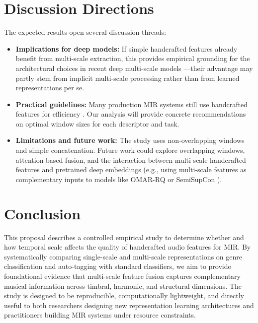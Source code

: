 \documentclass[conference]{IEEEtran}
\begin{document}
\section{Discussion Directions}

The expected results open several discussion threads:

\begin{itemize}
    \item \textbf{Implications for deep models:} If simple handcrafted features already benefit from multi-scale extraction, this provides empirical grounding for the architectural choices in recent deep multi-scale models \cite{buisson2024self, alonso2025omar}---their advantage may partly stem from implicit multi-scale processing rather than from learned representations per se.

    \item \textbf{Practical guidelines:} Many production MIR systems still use handcrafted features for efficiency \cite{tamm2024comparative}. Our analysis will provide concrete recommendations on optimal window sizes for each descriptor and task.

    \item \textbf{Limitations and future work:} The study uses non-overlapping windows and simple concatenation. Future work could explore overlapping windows, attention-based fusion, and the interaction between multi-scale handcrafted features and pretrained deep embeddings (e.g., using multi-scale features as complementary inputs to models like OMAR-RQ \cite{alonso2025omar} or SemiSupCon \cite{guinot2024semi}).
\end{itemize}

\section{Conclusion}

This proposal describes a controlled empirical study to determine whether and how temporal scale affects the quality of handcrafted audio features for MIR.
By systematically comparing single-scale and multi-scale representations on genre classification and auto-tagging with standard classifiers, we aim to provide foundational evidence that multi-scale feature fusion captures complementary musical information across timbral, harmonic, and structural dimensions.
The study is designed to be reproducible, computationally lightweight, and directly useful to both researchers designing new representation learning architectures and practitioners building MIR systems under resource constraints.



\end{document}
